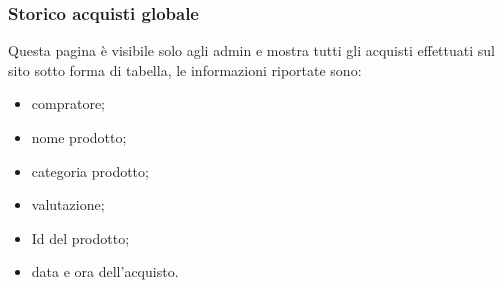 \subsubsection{Storico acquisti globale}
Questa pagina è visibile solo agli admin e mostra tutti gli acquisti effettuati sul sito sotto forma di tabella, le informazioni riportate sono:
\begin{itemize}
	\item compratore;
	\item nome prodotto;
	\item categoria prodotto;
	\item valutazione;
	\item Id del prodotto;
	\item data e ora dell'acquisto.
\end{itemize}
